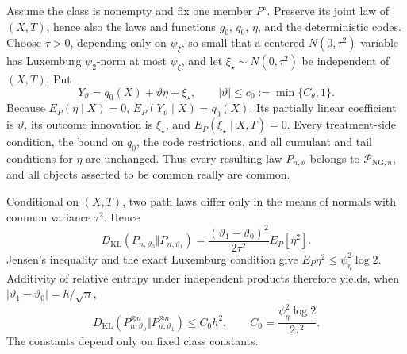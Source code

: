 Assume the class is nonempty and fix one member \(P^{\circ}\).  Preserve its joint law of \((X,T)\), hence also the laws and functions \(g_0\), \(q_0\), \(\eta\), and the deterministic codes.  Choose \(\tau>0\), depending only on \(\psi_{\xi}\), so small that a centered \(N(0,\tau^2)\) variable has Luxemburg \(\psi_2\)-norm at most \(\psi_{\xi}\), and let \(\xi_{\star}\sim N(0,\tau^2)\) be independent of \((X,T)\).  Put
\[
 Y_{\vartheta}=q_0(X)+\vartheta\eta+\xi_{\star},
 \qquad |\vartheta|\le c_0:=\min\{C_{\theta},1\}.
\]
Because \(E_P(\eta\mid X)=0\), \(E_P(Y_{\vartheta}\mid X)=q_0(X)\).  Its partially linear coefficient is \(\vartheta\), its outcome innovation is \(\xi_{\star}\), and
\(E_P(\xi_{\star}\mid X,T)=0\).  Every treatment-side condition, the bound on \(q_0\), the code restrictions, and all cumulant and tail conditions for \(\eta\) are unchanged.  Thus every resulting law \(P_{n,\vartheta}\) belongs to \(\mathcal P_{\mathrm{NG},n}\), and all objects asserted to be common really are common.

Conditional on \((X,T)\), two path laws differ only in the means of normals with common variance \(\tau^2\).  Hence
\[
 D_{\mathrm{KL}}(P_{n,\vartheta_0}\Vert P_{n,\vartheta_1})
 =\frac{(\vartheta_1-\vartheta_0)^2}{2\tau^2}E_P[\eta^2].
\]
Jensen's inequality and the exact Luxemburg condition give
\(E_P\eta^2\le\psi_{\eta}^2\log2\).  Additivity of relative entropy under independent products therefore yields, when \(|\vartheta_1-\vartheta_0|=h/\sqrt n\),
\[
 D_{\mathrm{KL}}(P_{n,\vartheta_0}^{\otimes n}\Vert
 P_{n,\vartheta_1}^{\otimes n})
 \le C_0h^2,
 \qquad C_0=\frac{\psi_{\eta}^2\log2}{2\tau^2}.
\]
The constants depend only on fixed class constants.